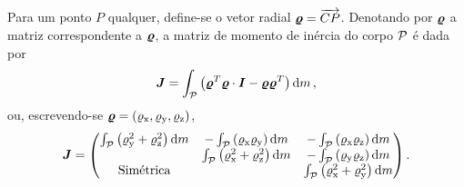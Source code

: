 Para um ponto \(P\) qualquer, define-se o vetor radial \(\bm{\varrho} = \overrightarrow{CP}\). Denotando por \(\bm{\varrho}\) a matriz correspondente a \(\bm{\varrho}\), a matriz de momento de inércia do corpo \(\mathcal{P}\) é dada por
\begin{equation*}
	\matrixOfInertia = \int_{\particle}\pqty{\transpose{\radialVectorMtx}\radialVectorMtx\cdot\identity - \radialVectorMtx\transpose{\radialVectorMtx}}\dd{m},
\end{equation*}
ou, escrevendo-se \(\radialVector = \explicitVectorCoordinates{\radialVectorScalar}\),
\begin{equation*}
	\matrixOfInertia =
	\begin{pmatrix}
		\int_{\particle} \pqty{\yComponent{\radialVectorScalar}^2 + \zComponent{\radialVectorScalar}^2} \dd{m}
		& - \int_{\particle} \pqty{\xComponent{\radialVectorScalar}\yComponent{\radialVectorScalar}} \dd{m}
		& - \int_{\particle} \pqty{\xComponent{\radialVectorScalar}\zComponent{\radialVectorScalar}} \dd{m} \\
		& \int_{\particle} \pqty{\xComponent{\radialVectorScalar}^2 + \zComponent{\radialVectorScalar}^2} \dd{m} 
		& - \int_{\particle} \pqty{\yComponent{\radialVectorScalar}\zComponent{\radialVectorScalar}} \dd{m} \\
		\text{Simétrica} 
		&  
		& \int_{\particle} \pqty{\xComponent{\radialVectorScalar}^2 + \yComponent{\radialVectorScalar}^2} \dd{m}
	\end{pmatrix}.
\end{equation*}

